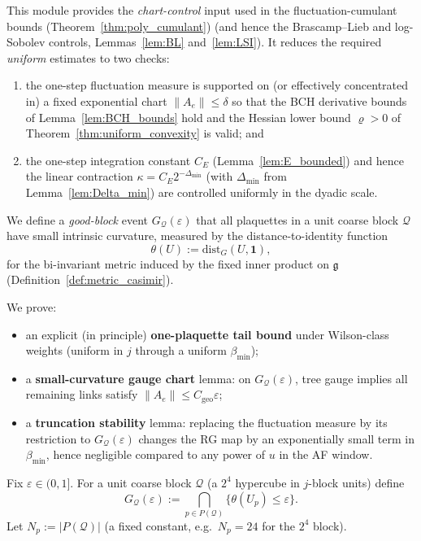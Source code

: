 This module provides the \emph{chart-control} input used in the fluctuation-cumulant bounds (Theorem~\ref{thm:poly_cumulant})
(and hence the Brascamp--Lieb and log-Sobolev controls, Lemmas~\ref{lem:BL} and~\ref{lem:LSI}).
It reduces the required \emph{uniform} estimates to two checks:
\begin{enumerate}[label=(\roman*)]
\item the one-step fluctuation measure is supported on (or effectively concentrated in) a fixed exponential chart $\|A_e\|\le \delta$
so that the BCH derivative bounds of Lemma~\ref{lem:BCH_bounds} hold and the Hessian lower bound $\varrho>0$ of Theorem~\ref{thm:uniform_convexity} is valid; and
\item the one-step integration constant $C_E$ (Lemma~\ref{lem:E_bounded}) and hence the linear contraction $\kappa=C_E2^{-\Delta_{\min}}$
(with $\Delta_{\min}$ from Lemma~\ref{lem:Delta_min}) are controlled uniformly in the dyadic scale.
\end{enumerate}

We define a \emph{good-block} event $G_{\mathcal Q}(\varepsilon)$ that all plaquettes in a unit coarse block $\mathcal Q$ have small intrinsic curvature,
measured by the distance-to-identity function
\[
\theta(U):=\mathrm{dist}_{G}(U,\mathbf 1),
\]
for the bi-invariant metric induced by the fixed inner product on $\mathfrak g$ (Definition~\ref{def:metric_casimir}).

We prove:
\begin{itemize}
\item an explicit (in principle) \textbf{one-plaquette tail bound} under Wilson-class weights (uniform in $j$ through a uniform $\beta_{\min}$);
\item a \textbf{small-curvature gauge chart} lemma: on $G_{\mathcal Q}(\varepsilon)$, tree gauge implies all remaining links satisfy $\|A_e\|\le C_{\mathrm{geo}}\varepsilon$;
\item a \textbf{truncation stability} lemma: replacing the fluctuation measure by its restriction to $G_{\mathcal Q}(\varepsilon)$ changes the RG map by an exponentially small term in $\beta_{\min}$, hence negligible compared to any power of $u$ in the AF window.
\end{itemize}

\begin{definition}\label{def:good_block}
Fix $\varepsilon\in(0,1]$. For a unit coarse block $\mathcal Q$ (a $2^4$ hypercube in $j$-block units) define
\[
G_{\mathcal Q}(\varepsilon):=\bigcap_{p\in P(\mathcal Q)}\{\theta(U_p)\le \varepsilon\}.
\]
Let $N_p:=|P(\mathcal Q)|$ (a fixed constant, e.g.\ $N_p=24$ for the $2^4$ block).
\end{definition}

